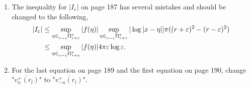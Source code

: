 \documentclass[12pt]{article}
\begin{document}
\begin{enumerate}
\item
The inequality for $|I_\varepsilon|$ on page 187 has several mistakes and should be changed to the following,
\begin{align*}
|I_\varepsilon| &\leq \sup_{\eta \in \prescript{}{r-\varepsilon}\Omega_{r+\varepsilon}^*} |f(\eta)| \sup_{\eta \in \prescript{}{r-\varepsilon}\Omega_{r+\varepsilon}^*} |\log|x - \eta|| \pi ((r+\varepsilon)^2 - (r-\varepsilon)^2) \\
&\leq \sup_{\eta \in \prescript{}{r-\varepsilon}\Omega_{r+\varepsilon}^*} |f(\eta)| 4\pi\varepsilon \log \varepsilon.
\end{align*}

\item
For the last equation on page 189 and the first equation on page 190, change "$\overline{v_n^+(r_l)}$" to "$\overline{v_{-n}^+(r_l)}$".

\end{enumerate}
\end{document}
